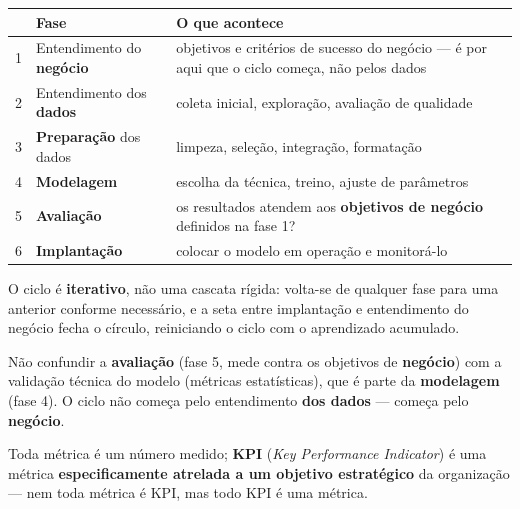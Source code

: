 \begin{conceito}
\begin{center}
\begin{tabular}{@{}p{0.6cm}p{3.6cm}p{6.8cm}@{}}
\toprule
& \textbf{Fase} & \textbf{O que acontece} \\
\midrule
1 & Entendimento do \textbf{negócio} & objetivos e critérios de sucesso do
negócio --- é por aqui que o ciclo começa, não pelos dados \\
2 & Entendimento dos \textbf{dados} & coleta inicial, exploração,
avaliação de qualidade \\
3 & \textbf{Preparação} dos dados & limpeza, seleção, integração,
formatação \\
4 & \textbf{Modelagem} & escolha da técnica, treino, ajuste de parâmetros
\\
5 & \textbf{Avaliação} & os resultados atendem aos \textbf{objetivos de
negócio} definidos na fase 1? \\
6 & \textbf{Implantação} & colocar o modelo em operação e monitorá-lo \\
\bottomrule
\end{tabular}
\end{center}

O ciclo é \textbf{iterativo}, não uma cascata rígida: volta-se de
qualquer fase para uma anterior conforme necessário, e a seta entre
implantação e entendimento do negócio fecha o círculo, reiniciando o
ciclo com o aprendizado acumulado.
\end{conceito}

\begin{cuidado}
Não confundir a \textbf{avaliação} (fase 5, mede contra os objetivos de
\textbf{negócio}) com a validação técnica do modelo (métricas
estatísticas), que é parte da \textbf{modelagem} (fase 4). O ciclo não
começa pelo entendimento \textbf{dos dados} --- começa pelo
\textbf{negócio}.
\end{cuidado}

\begin{conceito}
Toda métrica é um número medido; \textbf{KPI} (\textit{Key Performance
Indicator}) é uma métrica \textbf{especificamente atrelada a um objetivo
estratégico} da organização --- nem toda métrica é KPI, mas todo KPI é uma
métrica.
\end{conceito}

